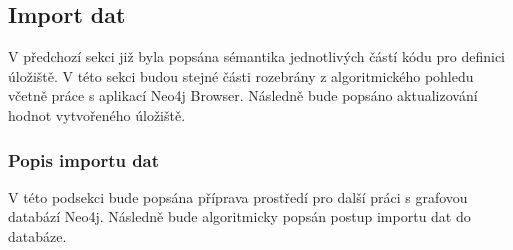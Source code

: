 \documentclass[a4paper, 11pt]{article}
\begin{document}
    \subsection{Import dat}
    V předchozí sekci již byla popsána sémantika jednotlivých částí kódu pro definici úložiště. V této sekci budou stejné části rozebrány z algoritmického pohledu včetně práce s aplikací Neo4j Browser. Následně bude popsáno aktualizování hodnot vytvořeného úložiště.

    \subsubsection{Popis importu dat}
    
    V této podsekci bude popsána příprava prostředí pro další práci s grafovou  databází Neo4j. Následně bude algoritmicky popsán postup importu dat do databáze.
\end{document}
